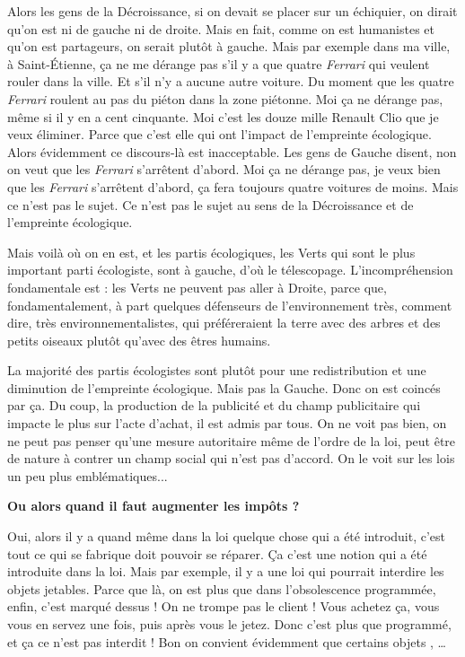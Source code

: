 \begin{small}
\smallbreak
Alors les gens de la Décroissance, si on devait se placer sur un échiquier, on dirait qu'on est ni de gauche ni de droite. Mais en fait, comme on est humanistes et qu'on est partageurs, on serait plutôt à gauche. Mais par exemple dans ma ville, à Saint-Étienne, ça ne me dérange pas s’il y a que quatre \textit{Ferrari} qui veulent rouler dans la ville. Et s’il n'y a aucune autre voiture. Du moment que les quatre \textit{Ferrari} roulent au pas du piéton dans la zone piétonne. Moi ça ne dérange pas, même si il y en a cent cinquante. Moi c'est les douze mille Renault Clio que je veux éliminer. Parce que c'est elle qui ont l'impact de l'empreinte écologique. Alors évidemment ce discours-là est inacceptable. Les gens de Gauche disent, non on veut que les \textit{Ferrari} s'arrêtent d'abord. Moi ça ne dérange pas, je veux bien que les \textit{Ferrari} s'arrêtent d'abord, ça fera toujours quatre voitures de moins. Mais ce n'est pas le sujet. Ce n'est pas le sujet au sens de la Décroissance et de l'empreinte écologique.

Mais voilà où on en est, et les partis écologiques, les Verts qui sont  le plus important parti écologiste, sont à gauche, d'où le télescopage. L’incompréhension fondamentale est : les Verts ne peuvent pas aller à Droite, parce que, fondamentalement, à part quelques défenseurs de l'environnement très, comment dire, très environnementalistes, qui préféreraient la terre avec des arbres et des petits oiseaux plutôt qu'avec des êtres humains. 

La majorité des partis écologistes sont plutôt pour une redistribution et une diminution de l'empreinte écologique. Mais pas la Gauche. Donc on est coincés par ça. Du coup, la production de la publicité et du champ publicitaire qui impacte le plus sur l'acte d'achat, il est admis par tous. On ne voit pas bien, on ne peut pas penser qu'une mesure autoritaire même de l'ordre de la loi, peut être de nature à contrer un champ social qui n'est pas d'accord. On le voit sur les lois un peu plus emblématiques...

\vspace{1\baselineskip}

\textbf{Ou alors quand il faut augmenter les impôts ?}

\vspace{1\baselineskip}

Oui, alors il y a quand même dans la loi quelque chose qui a été introduit, c'est tout ce qui se fabrique doit pouvoir se réparer. Ça c'est une notion qui a été introduite dans la loi. Mais par exemple, il y a une loi qui pourrait interdire les objets jetables. Parce que là, on est plus que dans l'obsolescence programmée, enfin, c'est marqué dessus ! On ne trompe pas le client ! Vous achetez ça, vous vous en servez une fois, puis après vous le jetez. Donc c'est plus que programmé, et ça ce n’est pas interdit ! Bon on convient évidemment que certains objets , …


\end{small}
